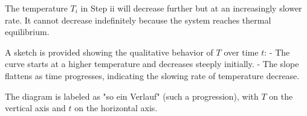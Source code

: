 The temperature \( T_i \) in Step ii will decrease further but at an increasingly slower rate. It cannot decrease indefinitely because the system reaches thermal equilibrium.  

A sketch is provided showing the qualitative behavior of \( T \) over time \( t \):  
- The curve starts at a higher temperature and decreases steeply initially.
- The slope flattens as time progresses, indicating the slowing rate of temperature decrease.  

The diagram is labeled as "so ein Verlauf" (such a progression), with \( T \) on the vertical axis and \( t \) on the horizontal axis.